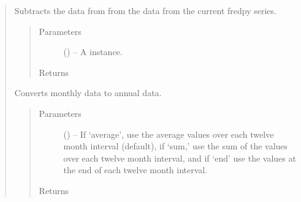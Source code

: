 \documentclass[letterpaper,10pt,openany,oneside,english]{sphinxmanual}
\begin{document}
\begin{fulllineitems}
\begin{quote}
\begin{fulllineitems}
\begin{quote}
\begin{description}
\end{description}\end{quote}

\end{fulllineitems}


\begin{fulllineitems}
\label{\detokenize{series_class:fredpy.series.minus}}
Subtracts the data from  from the data from the current fredpy series.
\begin{quote}\begin{description}
\item[{Parameters}] \leavevmode
{} ({\hyperref[\detokenize{series_class:fredpy.series}]{}}) -- A {\hyperref[\detokenize{series_class:fredpy.series}]{}} instance.

\item[{Returns}] \leavevmode
{\hyperref[\detokenize{series_class:fredpy.series}]{}}

\end{description}\end{quote}

\end{fulllineitems}


\begin{fulllineitems}
\label{\detokenize{series_class:fredpy.series.monthtoannual}}
Converts monthly data to annual data.
\begin{quote}\begin{description}
\item[{Parameters}] \leavevmode
{} (\href{https://docs.python.org/2/library/string.html\#module-string}{}) -- If `average', use the average values over each twelve month interval (default), if `sum,' use the sum of the values over each twelve month interval, and if `end' use the values at the end of each twelve month interval.

\item[{Returns}] \leavevmode
{\hyperref[\detokenize{series_class:fredpy.series}]{}}


\end{description}
\end{quote}
\end{fulllineitems}
\end{quote}
\end{fulllineitems}
\end{document}
